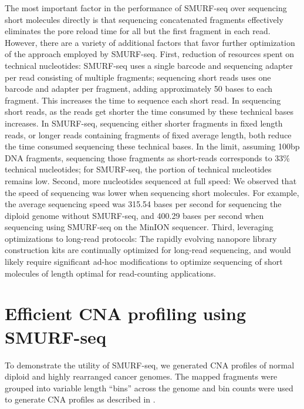 The most important factor in the performance of SMURF-seq over
sequencing short molecules directly is that sequencing concatenated
fragments effectively eliminates the pore reload time for all but the
first fragment in each read. However, there are a variety of additional
factors that favor further optimization of the approach employed by
SMURF-seq.
First, reduction of resources spent on technical nucleotides: SMURF-seq
uses a single barcode and sequencing adapter per read consisting of
multiple fragments; sequencing short reads uses one barcode and adapter
per fragment, adding approximately 50 bases to each fragment. This
increases the time to sequence each short read. In sequencing short
reads, as the reads get shorter the time consumed by these technical
bases increases. In SMURF-seq, sequencing either shorter fragments in
fixed length reads, or longer reads containing fragments of fixed
average length, both reduce the time consumed sequencing these technical
bases.
%
In the limit, assuming 100bp DNA fragments, sequencing those fragments
as short-reads corresponds to 33\% technical nucleotides; for SMURF-seq,
the portion of technical nucleotides remains low.
Second, more nucleotides sequenced at full speed: We observed that the
speed of sequencing was lower when sequencing short molecules. For
example, the average sequencing speed was 315.54 bases per second for
sequencing the diploid genome without SMURF-seq, and 400.29 bases per
second when sequencing using SMURF-seq on the MinION sequencer.
Third, leveraging optimizations to long-read protocols: The rapidly
evolving nanopore library construction kits are continually optimized
for long-read sequencing, and would likely require significant ad-hoc
modifications to optimize sequencing of short molecules of length
optimal for read-counting applications.


\section{Efficient CNA profiling using SMURF-seq}
To demonstrate the utility of SMURF-seq, we generated CNA profiles of
normal diploid and highly rearranged cancer genomes.  The mapped
fragments were grouped into variable length ``bins'' across the genome
and bin counts were used to generate CNA profiles as described in
\citep{baslan2012genome,kendall2014computational}.


